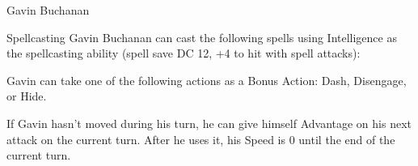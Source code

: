 \begin{DndMonster}[width=0.5\textwidth]{Gavin Buchanan}
	\begin{DndMonsterSpells}
		\item[Spellcasting] Gavin Buchanan can cast the following spells using Intelligence as the spellcasting ability (spell save DC 12, +4 to hit with spell attacks):
	\end{DndMonsterSpells}
	
	Gavin can take one of the following actions as a Bonus Action: Dash, Disengage, or Hide.
	
	If Gavin hasn't moved during his turn, he can give himself Advantage on his next attack on the current turn. After he uses it, his Speed is 0 until the end of the current turn.
\end{DndMonster}